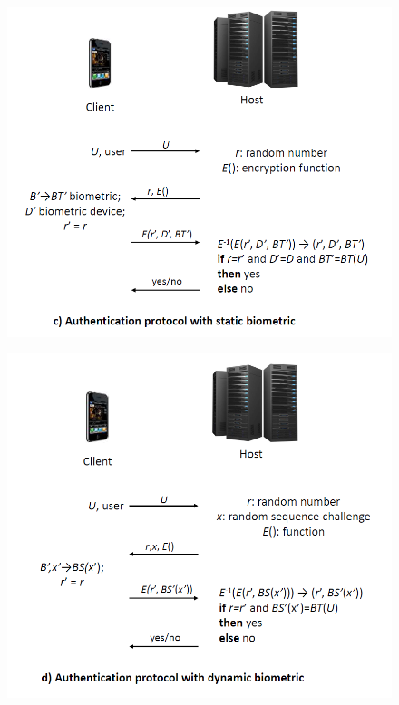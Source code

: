 \documentclass{article}
\begin{document}
                \begin{figure}[h]
                    \begin{center}
                        \includegraphics[scale=0.5]{../immagini/network_protocol3.png}
                    \end{center}
                \end{figure}
                \begin{figure}[h]
                    \begin{center}
                        \includegraphics[scale=0.5]{../immagini/network_protocol4.png}
                    \end{center}
                \end{figure}
        \newpage
\end{document}
